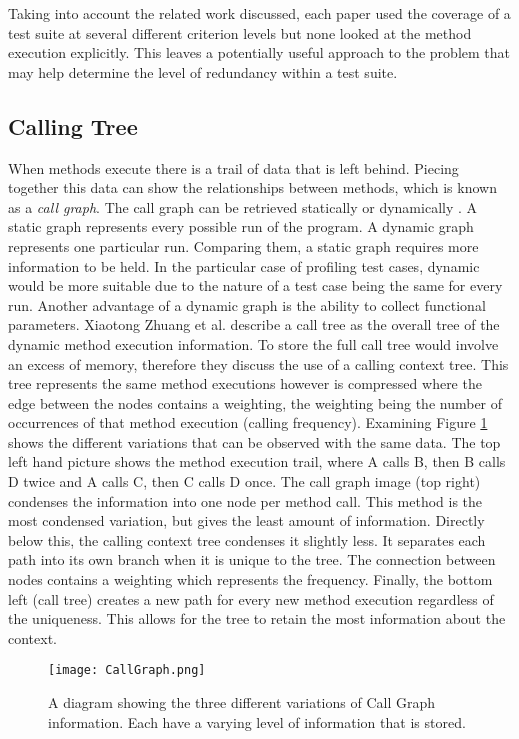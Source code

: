 Taking into account the related work discussed, each paper used the coverage of a test suite at several different criterion levels but none looked at the method execution explicitly. This leaves a potentially useful approach to the problem that may help determine the level of redundancy within a test suite. 
\subsection{Calling Tree}
When methods execute there is a trail of data that is left behind. Piecing together this data can show the relationships between methods, which is known as a \textit{call graph}. The call graph can be retrieved statically or dynamically \cite{graham1982gprof}. A static graph represents every possible run of the program. A dynamic graph represents one particular run. Comparing them, a static graph requires more information to be held. In the particular case of profiling test cases, dynamic would be more suitable due to the nature of a test case being the same for every run. Another advantage of a dynamic graph is the ability to collect functional parameters. Xiaotong Zhuang et al. \cite{Zhuang06accurate} describe a call tree as the overall tree of the dynamic method execution information. To store the full call tree would involve an excess of memory, therefore they discuss the use of a calling context tree. This tree represents the same method executions however is compressed where the edge between the nodes contains a weighting, the weighting being the number of occurrences of that method execution (calling frequency). Examining Figure \ref{fig:callgraph} shows the different variations that can be observed with the same data. The top left hand picture shows the method execution trail, where A calls B, then B calls D twice and A calls C, then C calls D once. The call graph image (top right) condenses the information into one node per method call. This method is the most condensed variation, but gives the least amount of information. Directly below this, the calling context tree condenses it slightly less. It separates each path into its own branch when it is unique to the tree. The connection between nodes contains a weighting which represents the frequency. Finally, the bottom left (call tree) creates a new path for every new method execution regardless of the uniqueness. This allows for the tree to retain the most information about the context.

\begin{figure}[h]
\begin{center}
\texttt{[image: CallGraph.png]}
\end{center}
\caption{A diagram showing the three different variations of Call Graph information. Each have a varying level of information that is stored.}
\label{fig:callgraph}
\end{figure}


